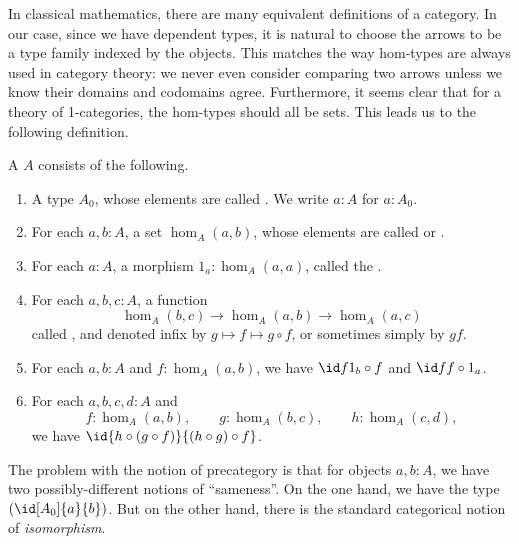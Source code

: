 In classical mathematics, there are many equivalent definitions of a category.
In our case, since we have dependent types, it is natural to choose the arrows to be a type family indexed by the objects.
This matches the way hom-types are always used in category theory: we never even consider comparing two arrows unless we know their domains and codomains agree.
Furthermore, it seems clear that for a theory of 1-categories, the hom-types should all be sets.
This leads us to the following definition.

\begin{defn}\label{ct:precategory}
  A 
  $A$ consists of the following.
  \begin{enumerate}
  \item A type $A_0$, whose elements are called .%
    We write $a:A$ for $a:A_0$.
  \item For each $a,b:A$, a set $\hom_A(a,b)$, whose elements are called  or .%
  \item For each $a:A$, a morphism $1_a:\hom_A(a,a)$, called the .%
  \item For each $a,b,c:A$, a function%
    \[  \hom_A(b,c) \to \hom_A(a,b) \to \hom_A(a,c) \]
    called , and denoted infix by $g\mapsto f\mapsto g\circ f$, or sometimes simply by $gf$.
  \item For each $a,b:A$ and $f:\hom_A(a,b)$, we have $\id f {1_b\circ f}$ and $\id f {f\circ 1_a}$.
  \item For each $a,b,c,d:A$ and
    \begin{equation*}
      f:\hom_A(a,b), \qquad
      g:\hom_A(b,c), \qquad
      h:\hom_A(c,d),
    \end{equation*}
    we have $\id {h\circ (g\circ f)}{(h\circ g)\circ f}$.
  \end{enumerate}
\end{defn}

The problem with the notion of precategory is that for objects $a,b:A$, we have two possibly-different notions of ``sameness''.
On the one hand, we have the type $(\id[A_0]{a}{b})$.
But on the other hand, there is the standard categorical notion of \emph{isomorphism}.

